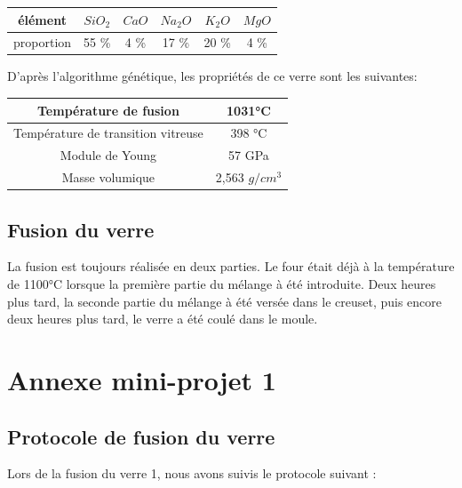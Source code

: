 \documentclass{article}
\begin{document}
\begin{table}[ht]
    \centering
    \begin{tabular}{|c|c|c|c|c|c|}
        \hline
        élément &  $SiO_2$ & $CaO$ & $Na_2O$ & $K_2O$ & $MgO$  \\
        \hline
        proportion & 55 \% & 4 \% & 17 \% & 20 \% & 4 \% \\
        \hline
        \end{tabular} 
    \end{table}

D'après l'algorithme génétique, les propriétés de ce verre sont les suivantes:

\begin{table}[ht]
    \centering
\begin{tabular}{|c|c|}
    \hline
    Température de fusion & 1031°C \\
    \hline
    Température de transition vitreuse & 398 °C \\
    \hline
    Module de Young & 57 GPa \\
    \hline
    Masse volumique & 2,563 $g/cm^{3}$ \\
    \hline
    \end{tabular} 
\end{table}

\subsection{Fusion du verre}

La fusion est toujours réalisée en deux parties.
Le four était déjà à la température de 1100°C lorsque la première partie du mélange à été introduite. Deux heures plus tard, la seconde partie du mélange à été versée dans le creuset, puis encore deux heures plus tard, le verre a été coulé dans le moule.

\section{Annexe mini-projet 1}
\subsection{Protocole de fusion du verre}

Lors de la fusion du verre 1, nous avons suivis le protocole suivant :
\end{document}
